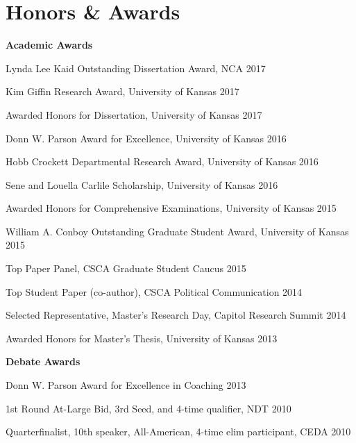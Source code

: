 
\section{Honors \& \hspace{5mm} Awards}
\textbf{Academic Awards}
  \begin{innerlist}
    \item Lynda Lee Kaid Outstanding Dissertation Award, NCA \hfill 2017
    \item Kim Giffin Research Award, University of Kansas \hfill 2017
    \item Awarded Honors for Dissertation, University of Kansas \hfill 2017
    \item Donn W. Parson Award for Excellence, University of Kansas \hfill 2016
    \item Hobb Crockett Departmental Research Award, University of Kansas \hfill 2016
    \item Sene and Louella Carlile Scholarship, University of Kansas \hfill 2016
    \item Awarded Honors for Comprehensive Examinations, University of Kansas \hfill 2015
    \item William A. Conboy Outstanding Graduate Student Award, University of Kansas \hfill 2015
    \item Top Paper Panel, CSCA Graduate Student Caucus \hfill 2015
    \item Top Student Paper (co-author), CSCA Political Communication \hfill 2014
    \item Selected Representative, Master's Research Day, Capitol Research Summit \hfill 2014
    \item Awarded Honors for Master's Thesis, University of Kansas \hfill 2013
  \end{innerlist}\vspace{1em}

\textbf{Debate Awards}
  \begin{innerlist}
    \item Donn W. Parson Award for Excellence in Coaching \hfill 2013
    \item 1st Round At-Large Bid, 3rd Seed, and 4-time qualifier, NDT \hfill 2010
    \item Quarterfinalist, 10th speaker, All-American, 4-time elim participant, CEDA \hfill 2010
  \end{innerlist}\vspace{-.075in}
